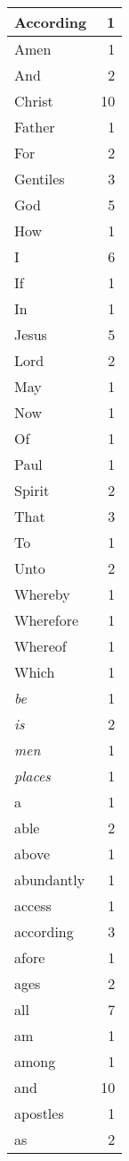 \begin{center}
\begin{longtable}{l|r}
According & 1\\ \hline 
Amen & 1\\ \hline 
And & 2\\ \hline 
Christ & 10\\ \hline 
Father & 1\\ \hline 
For & 2\\ \hline 
Gentiles & 3\\ \hline 
God & 5\\ \hline 
How & 1\\ \hline 
I & 6\\ \hline 
If & 1\\ \hline 
In & 1\\ \hline 
Jesus & 5\\ \hline 
Lord & 2\\ \hline 
May & 1\\ \hline 
Now & 1\\ \hline 
Of & 1\\ \hline 
Paul & 1\\ \hline 
Spirit & 2\\ \hline 
That & 3\\ \hline 
To & 1\\ \hline 
Unto & 2\\ \hline 
Whereby & 1\\ \hline 
Wherefore & 1\\ \hline 
Whereof & 1\\ \hline 
Which & 1\\ \hline 
\emph{be} & 1\\ \hline 
\emph{is} & 2\\ \hline 
\emph{men} & 1\\ \hline 
\emph{places} & 1\\ \hline 
a & 1\\ \hline 
able & 2\\ \hline 
above & 1\\ \hline 
abundantly & 1\\ \hline 
access & 1\\ \hline 
according & 3\\ \hline 
afore & 1\\ \hline 
ages & 2\\ \hline 
all & 7\\ \hline 
am & 1\\ \hline 
among & 1\\ \hline 
and & 10\\ \hline 
apostles & 1\\ \hline 
as & 2\\ \hline 

\end{longtable}
\end{center}
